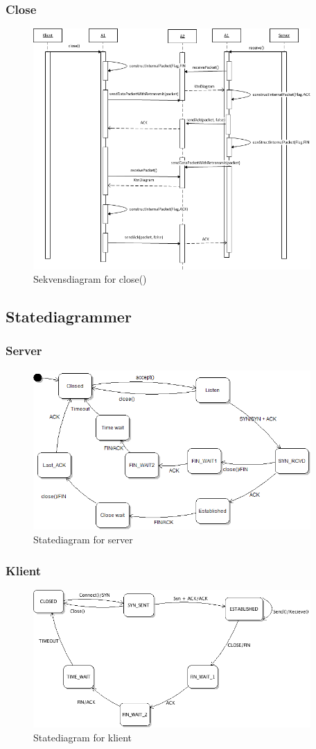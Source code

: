 \subsubsection{Close}
\begin{figure}[H]
\label{fig:closeSEQ}
\includegraphics[width=400px]{closeSEQ.png}
\caption{Sekvensdiagram for close()}
\end{figure}

\subsection{Statediagrammer}
\subsubsection{Server}
\begin{figure}[H]
\label{fig:serverSTATE}
\includegraphics[width=400px]{serverSTATE.png}
\caption{Statediagram for server}
\end{figure}

\subsubsection{Klient}
\begin{figure}[H]
\label{fig:clientSTATE}
\includegraphics[width=400px]{clientSTATE.png}
\caption{Statediagram for klient}
\end{figure}